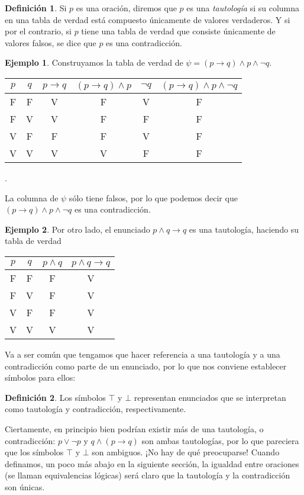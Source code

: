 \documentclass{book}
\theoremstyle{definition}
\newtheorem{df}{Definición}[chapter]
\newtheorem*{ejm}{Ejemplo}
\begin{document}
\begin{df}
	Si $p$ es una oración, diremos que $p$ es una \emph{tautología} si su columna en una tabla de verdad está compuesto únicamente de valores verdaderos.
	Y si por el contrario, si $p$ tiene una tabla de verdad que consiste únicamente de valores falsos, se dice que $p$ es una contradicción.
\end{df}

\begin{ejm}
	Construyamos la tabla de verdad de $\psi = (p\rightarrow q)\wedge p \wedge \neg q$.
		\begin{center}\begin{tabular}{|c|c||c|c|c|c|}
			\hline
			$p$ & $q$ & $p\rightarrow q$ & $\left(p\rightarrow q\right)\wedge p$ & $\neg q$& $(p\rightarrow q)\wedge p \wedge \neg q$ \\
			\hline \hline
			F & F & V & F & V & F \\
			\hline
			F & V & V & F & F & F \\
			\hline
			V & F & F & F & V & F \\
			\hline
			V & V & V & V & F & F \\
			\hline
	\end{tabular}.\end{center}
	La columna de $\psi$ sólo tiene falsos, por lo que podemos decir que $(p\rightarrow q)\wedge p \wedge \neg q$ es una contradicción.
\end{ejm}
\begin{ejm}
	Por otro lado, el enunciado $p\wedge q \rightarrow q$ es una tautología, haciendo su tabla de verdad
	\begin{center}\begin{tabular}{|c|c||c|c|}
		\hline
		$p$ & $q$ & $p \wedge q$ & $p\wedge q \rightarrow q$ \\
		\hline\hline
		F & F & F & V \\ \hline
		F & V & F & V \\ \hline
		V & F & F & V \\ \hline
		V & V & V & V \\ \hline
	\end{tabular}\end{center}
\end{ejm}

Va a ser común que tengamos que hacer referencia a una tautología y a una contradicción como parte de un enunciado, por lo que nos conviene establecer símbolos para ellos:
\begin{df}
	Los símbolos $\top$ y $\bot$ representan enunciados que se interpretan como tautología y contradicción, respectivamente.
\end{df}
Ciertamente, en principio bien podrían existir más de una tautología, o contradicción: $p\vee \neg p$ y $q \wedge (p \rightarrow q)$ son ambas tautologías, por lo que pareciera que los símbolos $\top$ y $\bot$ son ambiguos.
¡No hay de qué preocuparse! Cuando definamos, un poco más abajo en la siguiente sección, la igualdad entre oraciones (se llaman equivalencias lógicas) será claro que la tautología y la contradicción son únicas. %
\end{document}
